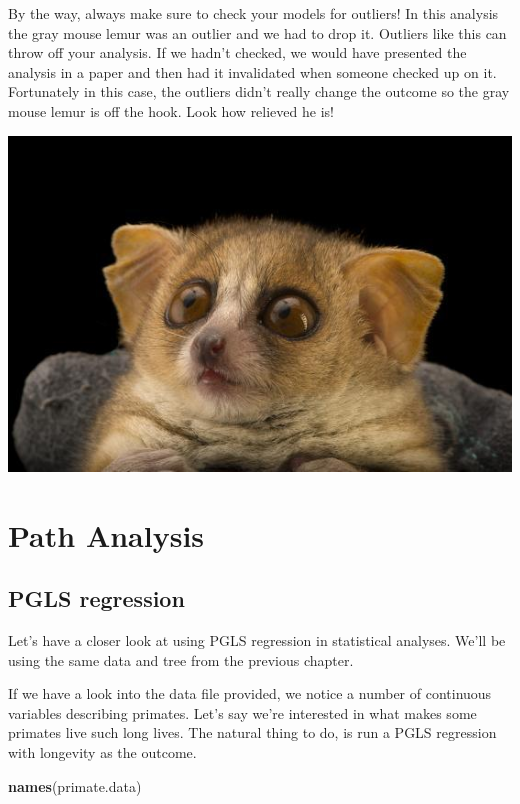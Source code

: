 \documentclass[
]{book}
\newenvironment{Shaded}{\begin{snugshade}}{\end{snugshade}}
\newcommand{\KeywordTok}[1]{\textcolor[rgb]{0.13,0.29,0.53}{\textbf{#1}}}
\newcommand{\NormalTok}[1]{#1}
\begin{document}
By the way, always make sure to check your models for outliers! In this analysis the gray mouse lemur was an outlier and we had to drop it. Outliers like this can throw off your analysis. If we hadn't checked, we would have presented the analysis in a paper and then had it invalidated when someone checked up on it. Fortunately in this case, the outliers didn't really change the outcome so the gray mouse lemur is off the hook. Look how relieved he is!

\begin{center}\includegraphics[width=7.64in]{Images/mouselemur} \end{center}

\hypertarget{pathanalysis}{%
\chapter{Path Analysis}\label{pathanalysis}}

\hypertarget{pgls-regression}{%
\section{PGLS regression}\label{pgls-regression}}

Let's have a closer look at using PGLS regression in statistical analyses. We'll be using the same data and tree from the previous chapter.

If we have a look into the data file provided, we notice a number of continuous variables describing primates. Let's say we're interested in what makes some primates live such long lives. The natural thing to do, is run a PGLS regression with longevity as the outcome.

\begin{Shaded}
\begin{Highlighting}[]
\KeywordTok{names}\NormalTok{(primate.data)}
\end{Highlighting}
\end{Shaded}
\end{document}
